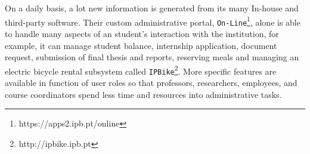 
On a daily basis, a lot new information is generated from its many In-house and third-party software. Their custom administrative portal, \texttt{On-Line}\footnote{https://apps2.ipb.pt/online}, alone is able to handle many aspects of an student's interaction with the institution, for example, it can manage student balance, internship application, document request, submission of final thesis and reports, reserving meals and managing an electric bicycle rental subsystem called \texttt{IPBike}\footnote{http://ipbike.ipb.pt}. More specific features are available in function of user roles so that professors, researchers, employees, and course coordinators spend less time and resources into administrative tasks.



